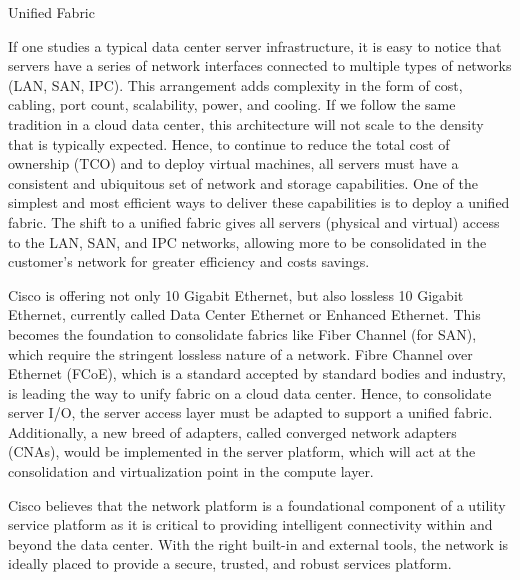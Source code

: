 Unified Fabric

If one studies a typical data center server infrastructure, it is easy to notice that servers have a series of network interfaces connected to multiple types of networks (LAN, SAN, IPC). This arrangement adds complexity in the form of cost, cabling, port count, scalability, power, and cooling. If we follow the same tradition in a cloud data center, this architecture will not scale to the density that is typically expected. Hence, to continue to reduce the total cost of ownership (TCO) and to deploy virtual machines, all servers must have a consistent and ubiquitous set of network and storage capabilities. One of the simplest and most efficient ways to deliver these capabilities is to deploy a unified fabric. The shift to a unified fabric gives all servers (physical and virtual) access to the LAN, SAN, and IPC networks, allowing more to be consolidated in the customer’s network for greater efficiency and costs savings.

Cisco is offering not only 10 Gigabit Ethernet, but also lossless 10 Gigabit Ethernet, currently called Data Center Ethernet or Enhanced Ethernet. This becomes the foundation to consolidate fabrics like Fiber Channel (for SAN), which require the stringent lossless nature of a network. Fibre Channel over Ethernet (FCoE), which is a standard accepted by standard bodies and industry, is leading the way to unify fabric on a cloud data center. Hence, to consolidate server I/O, the server access layer must be adapted to support a unified fabric. Additionally, a new breed of adapters, called converged network adapters (CNAs), would be implemented in the server platform, which will act at the consolidation and virtualization point in the compute layer.


Cisco believes that the network platform is a foundational component of a utility service platform as it is critical to providing intelligent connectivity within and beyond the data center. With the right built-in and external tools, the network is ideally placed to provide a secure, trusted, and robust services platform.


